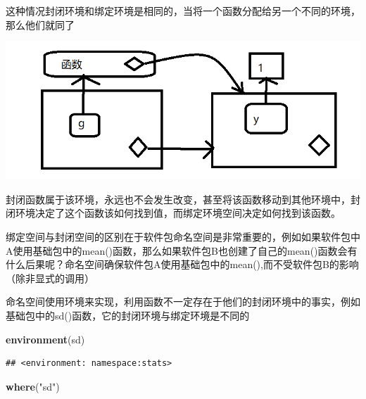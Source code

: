 \documentclass[]{book}
\newenvironment{Shaded}{\begin{snugshade}}{\end{snugshade}}
\newcommand{\KeywordTok}[1]{\textcolor[rgb]{0.13,0.29,0.53}{\textbf{#1}}}
\newcommand{\DecValTok}[1]{\textcolor[rgb]{0.00,0.00,0.81}{#1}}
\newcommand{\StringTok}[1]{\textcolor[rgb]{0.31,0.60,0.02}{#1}}
\newcommand{\ControlFlowTok}[1]{\textcolor[rgb]{0.13,0.29,0.53}{\textbf{#1}}}
\newcommand{\OperatorTok}[1]{\textcolor[rgb]{0.81,0.36,0.00}{\textbf{#1}}}
\newcommand{\NormalTok}[1]{#1}
\begin{document}
这种情况封闭环境和绑定环境是相同的，当将一个函数分配给另一个不同的环境，那么他们就同了

\begin{Shaded}
\end{Shaded}

\begin{center}\includegraphics{img/ch7-8} \end{center}

封闭函数属于该环境，永远也不会发生改变，甚至将该函数移动到其他环境中，封闭环境决定了这个函数该如何找到值，而绑定环境空间决定如何找到该函数。

绑定空间与封闭空间的区别在于软件包命名空间是非常重要的，例如如果软件包中A使用基础包中的mean()函数，那么如果软件包B也创建了自己的mean()函数会有什么后果呢？命名空间确保软件包A使用基础包中的mean(),而不受软件包B的影响（除非显式的调用）

命名空间使用环境来实现，利用函数不一定存在于他们的封闭环境中的事实，例如基础包中的sd()函数，它的封闭环境与绑定环境是不同的

\begin{Shaded}
\begin{Highlighting}[]
\KeywordTok{environment}\NormalTok{(sd)}
\end{Highlighting}
\end{Shaded}

\begin{verbatim}
## <environment: namespace:stats>
\end{verbatim}

\begin{Shaded}
\begin{Highlighting}[]
\KeywordTok{where}\NormalTok{(}\StringTok{"sd"}\NormalTok{)}
\end{Highlighting}
\end{Shaded}
\end{document}
